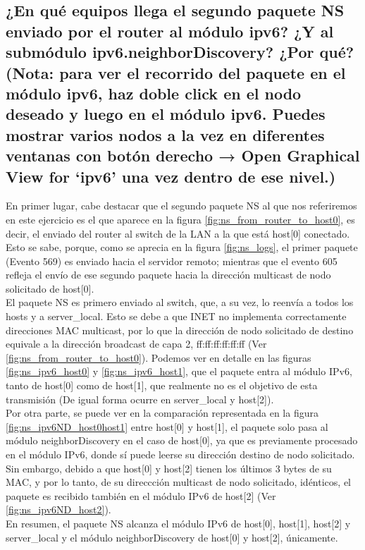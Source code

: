 \subsection{¿En qué equipos llega el segundo paquete NS enviado por el router al módulo ipv6? ¿Y al submódulo
ipv6.neighborDiscovery? ¿Por qué? (Nota: para ver el recorrido del paquete en el módulo ipv6, haz doble click en
el nodo deseado y luego en el módulo ipv6. Puedes mostrar varios nodos a la vez en diferentes ventanas con
botón derecho → Open Graphical View for ‘ipv6’ una vez dentro de ese nivel.)}

En primer lugar, cabe destacar que el segundo paquete NS al que nos referiremos en este ejercicio es el que aparece en la figura \ref{fig:ns_from_router_to_host0}, es decir, el enviado del router al switch de la LAN a la que está host[0] conectado. Esto se sabe, porque, como se aprecia en la figura \ref{fig:ns_logs}, el primer paquete (Evento 569) es enviado hacia el servidor remoto; mientras que el evento 605 refleja el envío de ese segundo paquete hacia la dirección multicast de nodo solicitado de host[0].\\
El paquete NS es primero enviado al switch, que, a su vez, lo reenvía a todos los hosts y a server\_local. Esto se debe a que INET no implementa correctamente direcciones MAC multicast, por lo que la dirección de nodo solicitado de destino equivale a la dirección broadcast de capa 2, ff:ff:ff:ff:ff:ff (Ver \ref{fig:ns_from_router_to_host0}). Podemos ver en detalle en las figuras \ref{fig:ns_ipv6_host0} y \ref{fig:ns_ipv6_host1}, que el paquete entra al módulo IPv6, tanto de host[0] como de host[1], que realmente no es el objetivo de esta transmisión (De igual forma ocurre en server\_local y host[2]).\\
Por otra parte, se puede ver en la comparación representada en la figura \ref{fig:ns_ipv6ND_host0host1} entre host[0] y host[1], el paquete solo pasa al módulo neighborDiscovery en el caso de host[0], ya que es previamente procesado en el módulo IPv6, donde sí puede leerse su dirección destino de nodo solicitado. Sin embargo, debido a que host[0] y host[2] tienen los últimos 3 bytes de su MAC, y por lo tanto, de su direccción multicast de nodo solicitado, idénticos, el paquete es recibido también en el módulo IPv6 de host[2] (Ver \ref{fig:ns_ipv6ND_host2}).\\
En resumen, el paquete NS alcanza el módulo IPv6 de host[0], host[1], host[2] y server\_local y el módulo neighborDiscovery de host[0] y host[2], únicamente. 

